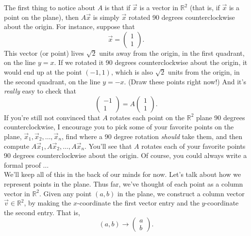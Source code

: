 \documentclass{article}
\begin{document}
The first thing to notice about $A$ is that if $\vec{x}$ is a vector in $\mathbb{R}^2$ (that is, if $\vec{x}$ is a point on the plane), then $A\vec{x}$ is simply $\vec{x}$ rotated 90 degrees counterclockwise about the origin. For instance, suppose that $$\vec{x} = \begin{pmatrix}1\\1\end{pmatrix}.$$ This vector (or point) lives $\sqrt{2}$ units away from the origin, in the first quadrant, on the line $y = x$. If we rotated it 90 degrees counterclockwise about the origin, it would end up at the point $\left(-1, 1\right)$, which is also $\sqrt{2}$ units from the origin, in the second quadrant, on the line $y = -x$. (Draw these points right now!) And it's \textit{really} easy to check that $$\begin{pmatrix}-1\\1\end{pmatrix} = A\begin{pmatrix}1\\1\end{pmatrix}.$$ If you're still not convinced that $A$ rotates each point on the $\mathbb{R}^2$ plane 90 degrees counterclockwise, I encourage you to pick some of your favorite points on the plane, $\vec{x}_1, \vec{x}_2, \dots, \vec{x}_n$, find where a 90 degree rotation \textit{should} take them, and then compute $A\vec{x}_1, A\vec{x}_2, \dots, A\vec{x}_n$. You'll see that $A$ rotates each of your favorite points 90 degrees counterclockwise about the origin. Of course, you could always write a formal proof $\dots$\\

We'll keep all of this in the back of our minds for now. Let's talk about how we represent points in the plane. Thus far, we've thought of each point as a column vector in $\mathbb{R}^2$. Given any point $\left(a, b\right)$ in the plane, we construct a column vector $\vec{v} \in \mathbb{R}^2$, by making the $x$-coordinate the first vector entry and the $y$-coordinate the second entry. That is, $$\left(a, b\right) \rightarrow \begin{pmatrix}a\\b\end{pmatrix}.$$
\end{document}
